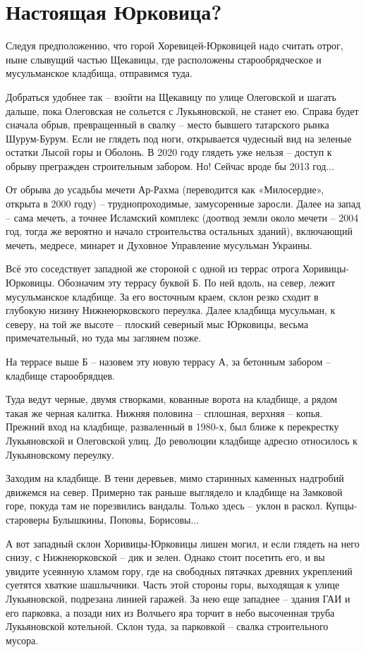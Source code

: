 \chapter{Настоящая Юрковица?}

Следуя предположению, что горой Хоревицей-Юрковицей надо считать отрог, ныне слывущий частью Щекавицы, где расположены старообрядческое и мусульманское кладбища, отправимся туда. 

Добраться удобнее так – взойти на Щекавицу по улице Олеговской и шагать дальше, пока Олеговская не сольется с Лукьяновской, не станет ею. Справа будет сначала обрыв, превращенный в свалку – место бывшего татарского рынка Шурум-Бурум. Если не глядеть под ноги, открывается чудесный вид на зеленые остатки Лысой горы и Оболонь. В 2020 году глядеть уже нельзя – доступ к обрыву прегражден строительным забором. Но! Сейчас вроде бы 2013 год...

От обрыва до усадьбы мечети Ар-Рахма (переводится как «Милосердие», открыта в 2000 году) – труднопроходимые, замусоренные заросли. Далее на запад – сама мечеть, а точнее Исламский комплекс (доотвод земли около мечети – 2004 год, тогда же вероятно и начало строительства остальных зданий), включающий мечеть, медресе, минарет и Духовное Управление мусульман Украины.

Всё это соседствует западной же стороной с одной из террас отрога Хоривицы-Юрковицы. Обозначим эту террасу буквой Б. По ней вдоль, на север, лежит мусульманское кладбище. За его восточным краем, склон резко сходит в глубокую низину Нижнеюрковского переулка. Далее кладбища мусульман, к северу, на той же высоте – плоский северный мыс Юрковицы, весьма примечательный, но туда мы заглянем позже.

На террасе выше Б – назовем эту новую террасу А, за бетонным забором – кладбище старообрядцев.

Туда ведут черные, двумя створками, кованные ворота на кладбище, а рядом такая же черная калитка. Нижняя половина – сплошная, верхняя – копья. Прежний вход на кладбище, разваленный в 1980-х, был ближе к перекрестку Лукьяновской и Олеговской улиц. До революции кладбище адресно относилось к Лукьяновскому переулку.

Заходим на кладбище. В тени деревьев, мимо старинных каменных надгробий движемся на север. Примерно так раньше выглядело и кладбище на Замковой горе, покуда там не порезвились вандалы. Только здесь – уклон в раскол. Купцы-староверы Булышкины, Поповы, Борисовы...

А вот западный склон Хоривицы-Юрковицы лишен могил, и если глядеть на него снизу, с Нижнеюрковской – дик и зелен. Однако стоит посетить его, и вы увидите усеянную хламом гору, где на свободных пятачках древних укреплений суетятся хваткие шашлычники. Часть этой стороны горы, выходящая к улице Лукьяновской, подрезана линией гаражей. За нею еще западнее – здания ГАИ и его парковка, а позади них из Волчьего яра торчит в небо высоченная труба Лукьяновской котельной. Склон туда, за парковкой – свалка строительного мусора.

